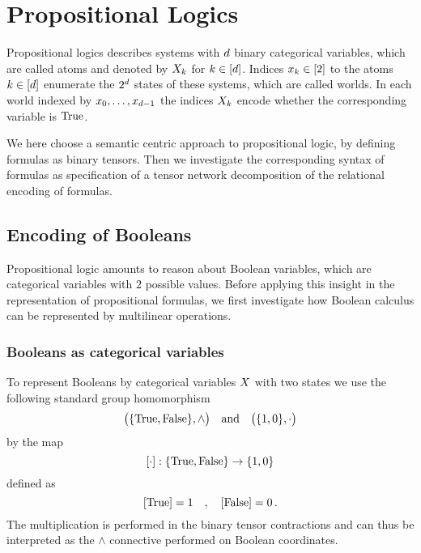 \section{Propositional Logics}\label{cha:FormulaTensors}\label{cha:logicalRepresentation}

Propositional logics describes systems with $d$ binary categorical variables, which are called atoms and denoted by $X_{k}$ for $k\in[d]$.
Indices $x_{k}\in[2]$ to the atoms $k\in[d]$ enumerate the $2^d$ states of these systems, which are called worlds.
In each world indexed by ${x_{0},\ldots,x_{d-1}}$ the indices $X_{k}$ encode whether the corresponding variable is $\mathrm{True}$. 

We here choose a semantic centric approach to propositional logic, by defining formulas as binary tensors.
Then we investigate the corresponding syntax of formulas as specification of a tensor network decomposition of the relational encoding of formulas.


\subsection{Encoding of Booleans}

Propositional logic amounts to reason about Boolean variables, which are categorical variables with $2$ possible values.
Before applying this insight in the representation of propositional formulas, we first investigate how Boolean calculus can be represented by multilinear operations.

\subsubsection{Booleans as categorical variables}


	To represent Booleans by categorical variables $X$ with two states we use the following standard group homomorphism %
		\[ \big(\{\mathrm{True},\mathrm{False}\},\land\big) \quad \text{and} \quad \big(\{ 1,0\},\cdot\big) \]
	by the map
    		\[ [\cdot]:\{\mathrm{True},\mathrm{False}\} \rightarrow \{1,0\} \]
	defined as
	    	\[ [\mathrm{True}] = 1 \quad , \quad [\mathrm{False}] = 0 \, . \]
	The multiplication is performed in the binary tensor contractions and can thus be interpreted as the $\land$ connective performed on Boolean coordinates.


